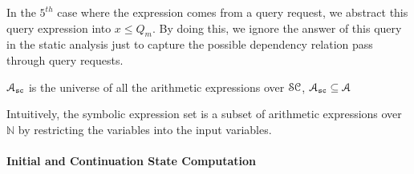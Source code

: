 In the $5^{th}$ case where the expression comes from a query request, we abstract this query expression into $x \leq Q_m$.
By doing this, we ignore the answer of this query in the static analysis just to capture the possible dependency relation pass through query requests.
\begin{defn}
 \label{def:symbolic_expr_domain}
 $\mathcal{A}_{\mathtt{sc}}$ is the universe of all the arithmetic expressions 
over $\mathcal{SC}$, $\mathcal{A}_{\mathtt{sc}} \subseteq \mathcal{A}$
\end{defn}
Intuitively, the symbolic expression set is a subset of arithmetic expressions over $\mathbb{N}$
by restricting the variables into the
input variables.

\paragraph{Initial and Continuation State Computation}

